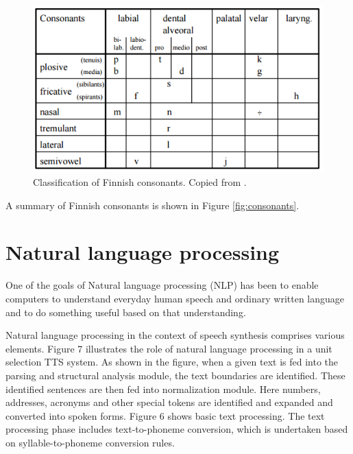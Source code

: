 \documentclass[11pt,a4paper,oneside,article]{memoir}
\begin{document}
\begin{figure}[h]
  \includegraphics[width=14cm]{consonants}
  \caption{Classification of Finnish consonants. Copied from \cite{hut}.}
  \label{fig:consonants}
\end{figure}

A summary of Finnish consonants is shown in Figure \vref{fig:consonants}.


\section{Natural language processing}

One of the goals of Natural language processing (NLP) has been to enable computers to understand everyday human speech and ordinary written language and to do something useful based on that understanding.\cite{markowitz}

Natural language processing in the context of speech synthesis comprises various elements. Figure 7 illustrates the role of natural language processing in a unit selection TTS system. As shown in the figure, when a given text is fed into the parsing and structural analysis module, the text boundaries are identified. These identified sentences are then fed into normalization module. Here numbers, addresses, acronyms and other special tokens are identified and expanded and converted into spoken forms.  Figure 6 shows basic text processing. The text processing phase includes text-to-phoneme conversion, which is undertaken based on syllable-to-phoneme conversion rules. \cite{chala}
\end{document}
